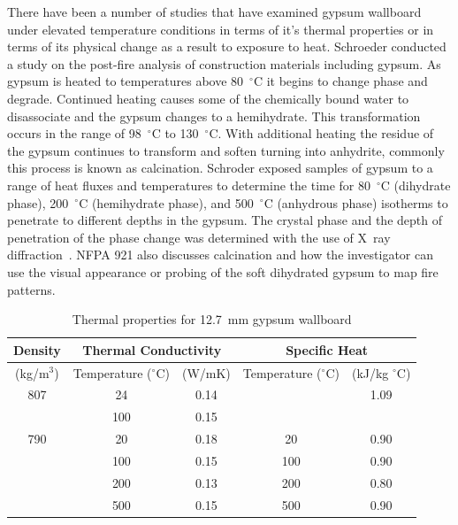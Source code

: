 \documentclass[twoside]{uocthesis}
\begin{document}
There have been a number of studies that have examined gypsum wallboard under elevated temperature conditions in terms of it's thermal properties or in terms of its physical change as a result to exposure to heat.  Schroeder conducted a study on the post-fire analysis of construction materials including gypsum.  As gypsum is heated to temperatures above 80~$^\circ$C it begins to change phase and degrade.  Continued heating causes some of the chemically bound water to disassociate and the gypsum changes to a hemihydrate.  This transformation occurs in the range of 98~$^\circ$C to 130~$^\circ$C. With additional heating the residue of the gypsum continues to transform and soften turning into anhydrite, commonly this process is known as calcination.  Schroder exposed samples of gypsum to a range of heat fluxes and temperatures to determine the time for 80~$^\circ$C (dihydrate phase), 200~$^\circ$C (hemihydrate phase), and 500~$^\circ$C (anhydrous phase) isotherms to penetrate to different depths in the gypsum.  The crystal phase and the depth of penetration of the phase change was determined with the use of X~\-ray diffraction~\cite{Schroeder:1999}.  NFPA 921 also discusses calcination and how the investigator can use the visual appearance or probing of the soft dihydrated gypsum to map fire patterns.

\begin{table}
	\centering
	\begin{tabular}{|c|c|c|c|c|}
		\hline Density & \multicolumn{2}{c|}{Thermal Conductivity}   & \multicolumn{2}{c|}{Specific Heat}  \\
		\hline (kg/m$^3$) & Temperature ($^{\circ}$C) & (W/mK)  & Temperature ($^{\circ}$C)  & (kJ/kg $^{\circ}$C) \\ \hline
		\hline 807  & 24 	& 0.14 	&  		& 1.09 \\
		\hline  	& 100 	& 0.15  &  		&  \\
		\hline 790 	& 20 	& 0.18	& 20 	& 0.90 \\
		\hline  	& 100 	& 0.15 	& 100 	& 0.90 \\
		\hline  	& 200 	& 0.13 	& 200 	& 0.80 \\
		\hline  	& 500 	& 0.15 	& 500	& 0.90 \\
		\hline
		\end{tabular}
		\caption[Thermal properties for 12.7~mm gypsum wallboard]{Thermal properties for 12.7~mm gypsum wallboard}
		\label{tab:Gypsum wallboard_Thermal_Properties}
		\end{table}
\end{document}
